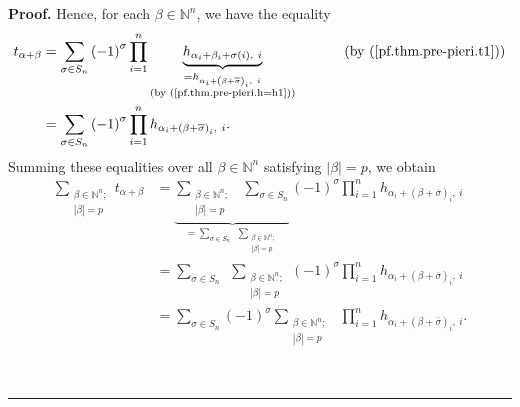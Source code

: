 \documentclass
[numbers=enddot,12pt,final,onecolumn,notitlepage,english]{scrartcl}%
\theoremstyle{definition}
\newenvironment{proof}[1][Proof]{\noindent\textbf{#1.} }{\ \rule{0.5em}{0.5em}}
\let\sumnonlimits\sum
\let\prodnonlimits\prod
\renewcommand{\sum}{\sumnonlimits\limits}
\renewcommand{\prod}{\prodnonlimits\limits}
\newenvironment{verlong}{}{}
\begin{document}
\begin{verlong}
\begin{proof}
Hence, for each $\beta\in\mathbb{N}^{n}$, we have the equality%
\begin{align*}
t_{\alpha+\beta}  &  =\sum_{\sigma\in S_{n}}\left(  -1\right)  ^{\sigma}%
\prod_{i=1}^{n}\underbrace{h_{\alpha_{i}+\beta_{i}+\sigma\left(  i\right)
,\ i}}_{\substack{=h_{\alpha_{i}+\left(  \beta+\overline{\sigma}\right)
_{i},\ i}\\\text{(by (\ref{pf.thm.pre-pieri.h=h1}))}}%
}\ \ \ \ \ \ \ \ \ \ \left(  \text{by (\ref{pf.thm.pre-pieri.t1})}\right) \\
&  =\sum_{\sigma\in S_{n}}\left(  -1\right)  ^{\sigma}\prod_{i=1}^{n}%
h_{\alpha_{i}+\left(  \beta+\overline{\sigma}\right)  _{i},\ i}.
\end{align*}
Summing these equalities over all $\beta\in\mathbb{N}^{n}$ satisfying
$\left\vert \beta\right\vert =p$, we obtain%
\begin{align}
\sum_{\substack{\beta\in\mathbb{N}^{n};\\\left\vert \beta\right\vert
=p}}t_{\alpha+\beta}  &  =\underbrace{\sum_{\substack{\beta\in\mathbb{N}%
^{n};\\\left\vert \beta\right\vert =p}}\ \ \sum_{\sigma\in S_{n}}}%
_{=\sum_{\sigma\in S_{n}}\ \ \sum_{\substack{\beta\in\mathbb{N}^{n}%
;\\\left\vert \beta\right\vert =p}}}\left(  -1\right)  ^{\sigma}\prod
_{i=1}^{n}h_{\alpha_{i}+\left(  \beta+\overline{\sigma}\right)  _{i}%
,\ i}\nonumber\\
&  =\sum_{\sigma\in S_{n}}\ \ \sum_{\substack{\beta\in\mathbb{N}%
^{n};\\\left\vert \beta\right\vert =p}}\left(  -1\right)  ^{\sigma}\prod
_{i=1}^{n}h_{\alpha_{i}+\left(  \beta+\overline{\sigma}\right)  _{i}%
,\ i}\nonumber\\
&  =\sum_{\sigma\in S_{n}}\left(  -1\right)  ^{\sigma}\sum_{\substack{\beta
\in\mathbb{N}^{n};\\\left\vert \beta\right\vert =p}}\ \ \prod_{i=1}%
^{n}h_{\alpha_{i}+\left(  \beta+\overline{\sigma}\right)  _{i},\ i}.
\label{pf.thm.pre-pieri.sumt=1}%
\end{align}



\end{proof}
\end{verlong}
\end{document}
